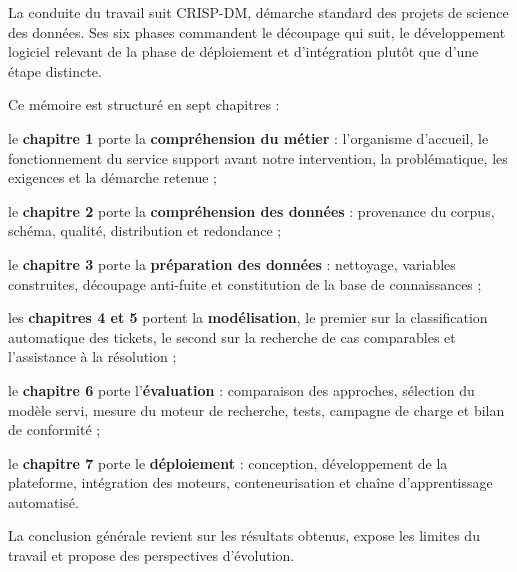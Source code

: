 La conduite du travail suit CRISP-DM, démarche standard des projets de science des données. Ses six
phases commandent le découpage qui suit, le développement logiciel relevant de la phase de
déploiement et d'intégration plutôt que d'une étape distincte.

\par{}
Ce mémoire est structuré en sept chapitres :

\begin{puces}
\item le \textbf{chapitre 1} porte la \textbf{compréhension du métier} : l'organisme d'accueil, le
fonctionnement du service support avant notre intervention, la problématique, les exigences et la
démarche retenue ;
\item le \textbf{chapitre 2} porte la \textbf{compréhension des données} : provenance du corpus,
schéma, qualité, distribution et redondance ;
\item le \textbf{chapitre 3} porte la \textbf{préparation des données} : nettoyage, variables
construites, découpage anti-fuite et constitution de la base de connaissances ;
\item les \textbf{chapitres 4 et 5} portent la \textbf{modélisation}, le premier sur la
classification automatique des tickets, le second sur la recherche de cas comparables et
l'assistance à la résolution ;
\item le \textbf{chapitre 6} porte l'\textbf{évaluation} : comparaison des approches, sélection du
modèle servi, mesure du moteur de recherche, tests, campagne de charge et bilan de conformité ;
\item le \textbf{chapitre 7} porte le \textbf{déploiement} : conception, développement de la
plateforme, intégration des moteurs, conteneurisation et chaîne d'apprentissage automatisé.
\end{puces}

La conclusion générale revient sur les résultats obtenus, expose les limites du travail et propose
des perspectives d'évolution.
